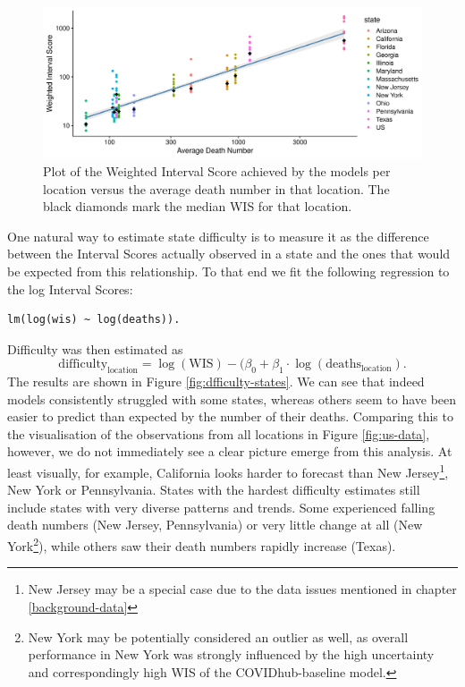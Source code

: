 \documentclass[
]{book}
\begin{document}
\begin{figure}
\includegraphics[width=1\linewidth]{../visualisation/chapter-5-results/scenario-baseline/wis-vs-deaths} \caption{Plot of the Weighted Interval Score achieved by the models per location versus the average death number in that location. The black diamonds mark the median WIS for that location.}\label{fig:wis-deaths}
\end{figure}

One natural way to estimate state difficulty is to measure it as the difference between the Interval Scores actually observed in a state and the ones that would be expected from this relationship. To that end we fit the following regression to the log Interval Scores:

\begin{verbatim}
lm(log(wis) ~ log(deaths)).
\end{verbatim}

Difficulty was then estimated as
\[\text{difficulty}_{\text{location}} = \log(\text{WIS}) - (\beta_0 + \beta_1 \cdot \log(\text{deaths}_{\text{location}}).\]
The results are shown in Figure \ref{fig:dfficulty-states}. We can see that indeed models consistently struggled with some states, whereas others seem to have been easier to predict than expected by the number of their deaths. Comparing this to the visualisation of the observations from all locations in Figure \ref{fig:us-data}, however, we do not immediately see a clear picture emerge from this analysis. At least visually, for example, California looks harder to forecast than New Jersey\footnote{New Jersey may be a special case due to the data issues mentioned in chapter \ref{background-data}}, New York or Pennsylvania. States with the hardest difficulty estimates still include states with very diverse patterns and trends. Some experienced falling death numbers (New Jersey, Pennsylvania) or very little change at all (New York\footnote{New York may be potentially considered an outlier as well, as overall performance in New York was strongly influenced by the high uncertainty and correspondingly high WIS of the COVIDhub-baseline model.}), while others saw their death numbers rapidly increase (Texas).
\end{document}
